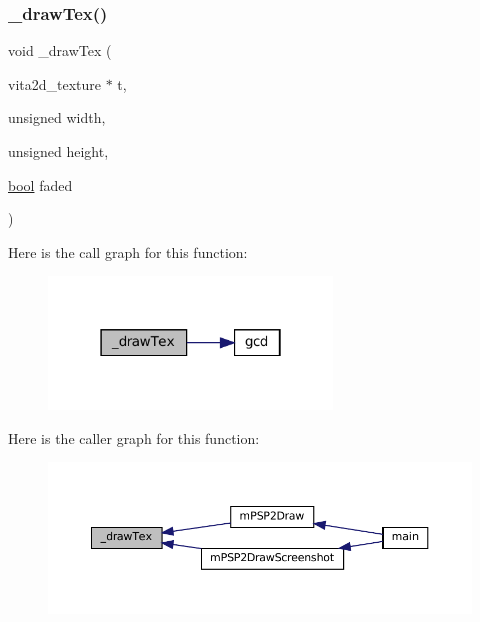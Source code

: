\subsubsection{\texorpdfstring{\+\_\+draw\+Tex()}{\_drawTex()}}
{\footnotesize\ttfamily void \+\_\+draw\+Tex (\begin{DoxyParamCaption}\item[{vita2d\+\_\+texture $\ast$}]{t,  }\item[{unsigned}]{width,  }\item[{unsigned}]{height,  }\item[{\mbox{\hyperlink{libretro_8h_a4a26dcae73fb7e1528214a068aca317e}{bool}}}]{faded }\end{DoxyParamCaption})}

Here is the call graph for this function\+:
\nopagebreak
\begin{figure}[H]
\begin{center}
\leavevmode
\includegraphics[width=214pt]{psp2-context_8c_a8c8e8d5d2406306e272f2388bb3a8e20_cgraph}
\end{center}
\end{figure}
Here is the caller graph for this function\+:
\nopagebreak
\begin{figure}[H]
\begin{center}
\leavevmode
\includegraphics[width=350pt]{psp2-context_8c_a8c8e8d5d2406306e272f2388bb3a8e20_icgraph}
\end{center}
\end{figure}
\mbox{\label{psp2-context_8c_a2505e2cf7b8b3afbc22087cc337213ac}} 
